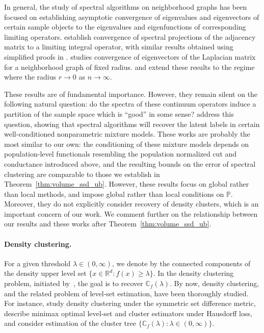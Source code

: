 \documentclass[11pt,twoside]{article}
\newcommand{\Reals}{\mathbb{R}}
\newcommand{\1}{\mathbf{1}}
\newcommand{\Rd}{\Reals^d}
\newcommand{\mbb}[1]{\mathbb{#1}}
\newcommand{\Pbb}{\mathbb{P}}
\begin{document}
In general, the study of spectral algorithms on neighborhood graphs has been focused on establishing asymptotic convergence of eigenvalues and eigenvectors of certain sample objects to the eigenvalues and eigenfunctions of corresponding limiting operators. \citet{koltchinskii2000} establish convergence of spectral projections of the adjacency matrix to a limiting integral operator, with similar results obtained using simplified proofs in \citet{rosasco10}. \citet{vonluxburg2008} studies convergence of eigenvectors of the Laplacian matrix for a neighborhood graph of fixed radius. \citet{belkin07} and \citet{garciatrillos18} extend these results to the regime where the radius $r \to 0$ as $n \to \infty$. 

These results are of fundamental importance. However, they remain silent on the following natural question: do the spectra of these continuum operators induce a partition of the sample space which is ``good'' in some sense? \citet{shi2009,schiebinger2015,garciatrillos19,hoffmann2019} address this question, showing that spectral algorithms will recover the latent labels in certain well-conditioned nonparametric mixture models. These works are probably the most similar to our own: the conditioning of these mixture models depends on population-level functionals resembling the population normalized cut and conductance introduced above, and the resulting bounds on the error of spectral clustering are comparable to those we establish in Theorem~\ref{thm:volume_ssd_ub}. However, these results focus on global rather than local methods, and impose global rather than local conditions on $\Pbb$. Moreover, they do not explicitly consider recovery of density clusters, which is an important concern of our work. We comment further on the relationship between our results and these works after Theorem~\ref{thm:volume_ssd_ub}.

\paragraph{Density clustering.} For a given threshold $\lambda \in (0,\infty)$, we denote by \smash{$\mbb{C}_f(\lambda)$} the connected components of the density upper level set $\{x \in \Rd: f(x) \geq \lambda\}$. In the density clustering problem, initiated by~\cite{hartigan1975}, the goal is to recover $\mbb{C}_{f}(\lambda)$. By now, density clustering, and the related problem of level-set estimation, have been thoroughly studied. For instance, \citet{polonik1995,rigollet2009, rinaldo2010, steinwart2015} study density clustering under the symmetric set difference metric, \citet{tsybakov1997,singh2009,jiang2017} describe minimax optimal level-set and cluster estimators under Hausdorff loss, and \citet{hartigan1981,chaudhuri2010,kpotufe11,balakrishnan2013,steinwart2017,wang2019} consider estimation of the cluster tree $\{\mbb{C}_f(\lambda): \lambda \in (0,\infty)\}$.
\end{document}
